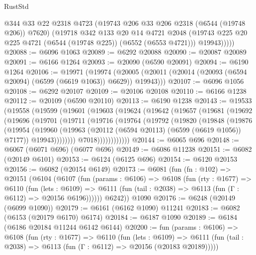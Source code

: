 \begin{lexlean}{RustStd}
\begin{coremodule}
            @344
            @33
            @22
            @2318
            @4723
            (@19743 @206 @33 @206 @2318 (@6544 (@19748 @206)) @7620)
            (@19718
              @342
              @133
              @20
              @14
              @4721
              @2048
              (@19743 @225 @20 @225 @4721 (@6544 (@19748 @225)) (@6552 (@6553 @4721)))
              @19943)))))
@20088 := @6096 @1063
@20089 := @6292 @20088
@20090 := @20087 @20089
@20091 := @6166 @1264
@20093 := @20090 (@6590 @20091)
@20094 := @6190 @1264
@20106 := @19971
    (@19974 (@20005 (@20011 (@20014 (@20093 (@6594 @20094) (@6599 (@6619 @1063)) @6629)) @19943)))
@20107 := @6096 @1056
@20108 := @6292 @20107
@20109 := @20106 @20108
@20110 := @6166 @1238
@20112 := @20109 (@6590 @20110)
@20113 := @6190 @1238
@20143 := @19533
    (@19558
      (@19599
        (@19601
          (@19603
            (@19624
              (@19642
                (@19657
                  (@19681
                    (@19692
                      (@19696
                        (@19701
                          (@19711
                            (@19716
                              (@19764
                                (@19792
                                  (@19820
                                    (@19848
                                      (@19876
                                        (@19954
                                          (@19960
                                            (@19963
                                              (@20112 (@6594 @20113) (@6599 (@6619 @1056)) @7177))
                                            @19943))))))))
                            @7018))))))))))))
@20144 := @6065 @696
@20148 := @6067 (@6071 @696) (@6077 @696)
@20149 := @6086 @11238
@20151 := @6082 (@20149 @6101)
@20153 := @6124 (@6125 @696)
@20154 := @6120 @20153
@20156 := @6082 (@20154 @6149)
@20173 := @6081
    (fun (fn : @102) =>
    @20151
      (@6104
        (@6107
          (fun (params : @6106) =>
          @6108
            (fun (rty : @1677) =>
            @6110
              (fun (lets : @6109) =>
              @6111 (fun (tail : @2038) => @6113 (fun (Γ : @6112) => @20156 @6196))))))
        @6242))
    @1090
@20176 := @6248 (@20149 (@6099 @1090))
@20179 := @6161 (@6162 @1090) @11241
@20183 := @6082 (@6153 (@20179 @6170) @6174)
@20184 := @6187 @1090
@20189 := @6184 (@6186 @20184 @11244 @6142 @6144)
@20200 := fun (params : @6106) =>
  @6108
    (fun (rty : @1677) =>
    @6110
      (fun (lets : @6109) =>
      @6111 (fun (tail : @2038) => @6113 (fun (Γ : @6112) => @20156 (@20183 @20189)))))

\end{coremodule}
\end{lexlean}
